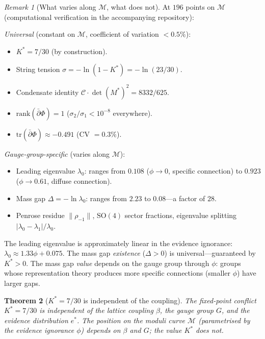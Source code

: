 \documentclass[11pt,a4paper]{article}
\newtheorem{theorem}{Theorem}[section]
\theoremstyle{definition}
\theoremstyle{remark}
\newtheorem{remark}[theorem]{Remark}
\newcommand{\dbar}{\bar{\partial}}
\begin{document}
\begin{remark}[What varies along $\mathcal{M}$, what does not]\label{rem:moduli}
At $196$ points on $\mathcal{M}$ (computational verification in the accompanying repository):

\emph{Universal} (constant on $\mathcal{M}$, coefficient of variation $<0.5\%$):
\begin{itemize}[nosep]
\item $K^*=7/30$ (by construction).
\item String tension $\sigma=-\ln(1-K^*)=-\ln(23/30)$.
\item Condensate identity $\mathcal{C}\cdot\det(M^*)^2=8332/625$.
\item $\mathrm{rank}(\dbar\Phi)=1$ ($\sigma_2/\sigma_1<10^{-8}$ everywhere).
\item $\mathrm{tr}(\dbar\Phi)\approx -0.491$ (CV $=0.3\%$).
\end{itemize}

\emph{Gauge-group-specific} (varies along $\mathcal{M}$):
\begin{itemize}[nosep]
\item Leading eigenvalue $\lambda_0$: ranges from $0.108$ ($\phi\to 0$, specific connection) to $0.923$ ($\phi\to 0.61$, diffuse connection).
\item Mass gap $\Delta=-\ln\lambda_0$: ranges from $2.23$ to $0.08$---a factor of $28$.
\item Penrose residue $\|\rho_{-1}\|$, $\mathrm{SO}(4)$ sector fractions, eigenvalue splitting $|\lambda_0-\lambda_1|/\lambda_0$.
\end{itemize}

The leading eigenvalue is approximately linear in the evidence ignorance: $\lambda_0\approx 1.33\phi+0.075$. The mass gap \emph{existence} ($\Delta>0$) is universal---guaranteed by $K^*>0$. The mass gap \emph{value} depends on the gauge group through $\phi$: groups whose representation theory produces more specific connections (smaller $\phi$) have larger gaps.
\end{remark}


\begin{theorem}[$K^*=7/30$ is independent of the coupling]\label{thm:K_coupling_independent}
The fixed-point conflict $K^*=7/30$ is independent of the lattice coupling $\beta$, the gauge group $G$, and the evidence distribution $e^*$. The position on the moduli curve $\mathcal{M}$ (parametrised by the evidence ignorance $\phi$) depends on $\beta$ and $G$; the value $K^*$ does not.
\end{theorem}
\end{document}
